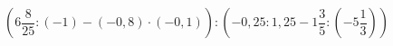 \begin{ex}[type=calculate]
	\begin{condition}
		\( \left( 6\dfrac{8}{25}:(-1)-(-0,8)\cdot(-0,1) \right):\left( -0,25:1,25-1\dfrac{3}{5}:\left( -5\dfrac{1}{3} \right) \right) \)
	\end{condition}
	\answer{}
\end{ex}
